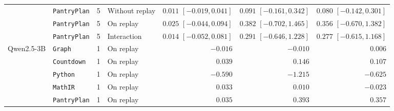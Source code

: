 \begin{table}[!htbp]
\begin{tabular}{llr l rrr}
 & \texttt{PantryPlan} & 5 & Without replay & $0.011$ $[-0.019, 0.041]$ & $0.091$ $[-0.161, 0.342]$ & $0.080$ $[-0.142, 0.301]$ \\
 & \texttt{PantryPlan} & 5 & On replay & $0.025$ $[-0.044, 0.094]$ & $0.382$ $[-0.702, 1.465]$ & $0.356$ $[-0.670, 1.382]$ \\
 & \texttt{PantryPlan} & 5 & Interaction & $0.014$ $[-0.052, 0.081]$ & $0.291$ $[-0.646, 1.228]$ & $0.277$ $[-0.615, 1.168]$ \\
\midrule
Qwen2.5-3B & \texttt{Graph} & 1 & On replay & $-0.016$ & $-0.010$ & $0.006$ \\
 & \texttt{Countdown} & 1 & On replay & $0.039$ & $0.146$ & $0.107$ \\
 & \texttt{Python} & 1 & On replay & $-0.590$ & $-1.215$ & $-0.625$ \\
 & \texttt{MathIR} & 1 & On replay & $0.033$ & $0.010$ & $-0.023$ \\
 & \texttt{PantryPlan} & 1 & On replay & $0.035$ & $0.393$ & $0.357$ \\
\bottomrule
\end{tabular}
\end{table}

